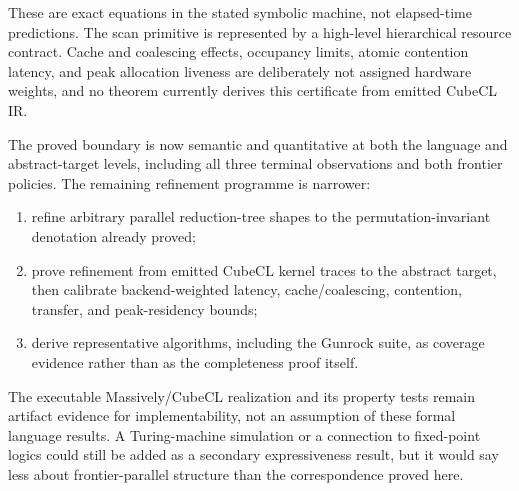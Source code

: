 These are exact equations in the stated symbolic machine, not elapsed-time
predictions.  The scan primitive is represented by a high-level hierarchical
resource contract.  Cache and coalescing effects, occupancy limits, atomic
contention latency, and peak allocation liveness are deliberately not assigned
hardware weights, and no theorem currently derives this certificate from
emitted CubeCL IR.

The proved boundary is now semantic and quantitative at both the language and
abstract-target levels, including all three terminal observations and both
frontier policies.  The remaining refinement programme is narrower:

\begin{enumerate}
  \item refine arbitrary parallel reduction-tree shapes to the
        permutation-invariant denotation already proved;
  \item prove refinement from emitted CubeCL kernel traces to the abstract
        target, then calibrate backend-weighted latency, cache/coalescing,
        contention, transfer, and peak-residency bounds;
  \item derive representative algorithms, including the Gunrock suite, as
        coverage evidence rather than as the completeness proof itself.
\end{enumerate}

The executable Massively/CubeCL realization and its property tests remain
artifact evidence for implementability, not an assumption of these formal
language results.  A Turing-machine simulation or a connection to fixed-point
logics could still be added as a secondary expressiveness result, but it would
say less about frontier-parallel structure than the correspondence proved
here.
